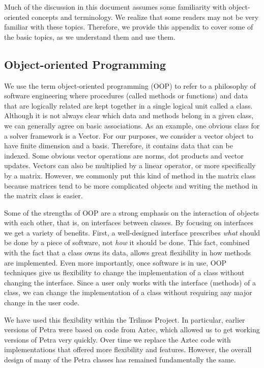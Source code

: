 \documentclass[12pt,relax]{TrilinosOverview}
\begin{document}
Much of the discussion in this document assumes some familiarity with
object-oriented	concepts and terminology. We realize that some readers may not
be very familiar with these topics. Therefore, we provide this appendix to
cover some of the basic topics, as we understand them and use them.

\subsection{Object-oriented Programming}
We use the term object-oriented programming (OOP) to refer to a philosophy of 
software engineering where procedures (called methods or functions) and data
that are logically related are kept together in a single logical unit called a
class.  Although it is not always clear which data and methods belong in a
given class, we can generally agree on basic associations.  As an example, one
obvious class for a solver framework is a Vector.  For our purposes, we
consider a vector object to have finite dimension and a basis.  Therefore, it
contains data that can be indexed.  Some obvious vector operations are norms,
dot products and vector updates.  Vectors can also be multiplied by a linear operator,
or more specifically by a matrix.  However, we commonly put this kind of method in the matrix
class because matrices tend to be more complicated objects and writing the method in the matrix
class is easier.

Some of the strengths of OOP are a strong emphasis on the interaction of objects with each
other, that is, on interfaces between classes.  By focusing on interfaces we get a variety of
benefits.  First, a well-designed interface prescribes {\it what} should be done by a piece of
software, not {\it how} it should be done.  This fact, combined with the fact that a class
owns its data, allows great flexibility in how methods are implemented.  Even more importantly,
once software is in use, OOP techniques give us flexibility to change the implementation
of a class without changing the interface.  Since a user only works with the interface 
(methods) of a class, we can change the implementation of a class without requiring any major
change in the user code.  

We have used this flexibility within the Trilinos Project.  In particular, earlier versions
of Petra were based on code from Aztec, which allowed us to get working versions of Petra
very quickly.  Over time we replace the Aztec code with implementations that offered more
flexibility and features.  However, the overall design of many of the Petra classes has
remained fundamentally the same.
\end{document}
